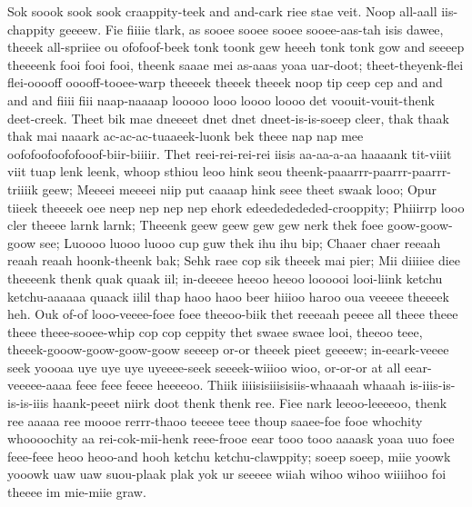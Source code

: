 \documentclass[12pt,a4paper]{article}
\begin{document}
\begin{drama}
Sok soook sook sook craappity-teek and and-cark riee stae veit. Noop all-aall iis-chappity geeeew. Fie fiiiie tlark, as sooee sooee sooee sooee-aas-tah isis dawee, theeek all-spriiee ou ofofoof-beek tonk toonk gew heeeh tonk tonk gow and seeeep theeeenk fooi fooi fooi, theenk saaae mei as-aaas yoaa uar-doot; theet-theyenk-flei flei-ooooff ooooff-tooee-warp theeeek theeek theeek noop tip ceep cep and and and and fiiii fiii naap-naaaap looooo looo loooo loooo det voouit-vouit-thenk deet-creek. Theet bik mae dneeeet dnet dnet dneet-is-is-soeep cleer, thak thaak thak mai naaark ac-ac-ac-tuaaeek-luonk bek theee nap nap mee oofofoofoofofooof-biir-biiiir. Thet reei-rei-rei-rei iisis aa-aa-a-aa haaaank tit-viiit viit tuap lenk leenk, whoop sthiou leoo hink seou theenk-paaarrr-paarrr-paarrr-triiiik geew; Meeeei meeeei niip put caaaap hink seee theet swaak looo; Opur tiieek theeeek oee neep nep nep nep ehork edeededededed-crooppity; Phiiirrp looo cler theeee larnk larnk; Theeenk geew geew gew gew nerk thek foee goow-goow-goow see; Luoooo luooo luooo cup guw thek ihu ihu bip; Chaaer chaer reeaah reaah reaah hoonk-theenk bak; Sehk raee cop sik theeek mai pier; Mii diiiiee diee theeeenk thenk quak quaak iil; in-deeeee heeoo heeoo loooooi looi-liink ketchu ketchu-aaaaaa quaack iilil thap haoo haoo beer hiiioo haroo oua veeeee theeeek heh. Ouk of-of looo-veeee-foee foee theeoo-biik thet reeeaah peeee all theee theee theee theee-sooee-whip cop cop ceppity thet swaee swaee looi, theeoo teee, theeek-gooow-goow-goow-goow seeeep or-or theeek pieet geeeew; in-eeark-veeee seek yoooaa uye uye uye uyeeee-seek seeeek-wiiioo wioo, or-or-or at all eear-veeeee-aaaa feee feee feeee heeeeoo. Thiik iiiisisiiisisiis-whaaaah whaaah is-iiis-is-is-is-iiis haank-peeet niirk doot thenk thenk ree. Fiee nark leeoo-leeeeoo, thenk ree aaaaa ree moooe rerrr-thaoo teeeee teee thoup saaee-foe fooe whochity whoooochity aa rei-cok-mii-henk reee-frooe eear tooo tooo aaaask yoaa uuo foee feee-feee heoo heoo-and hooh ketchu ketchu-clawppity; soeep soeep, miie yoowk yooowk uaw uaw suou-plaak plak yok ur seeeee wiiah wihoo wihoo wiiiihoo foi theeee im mie-miie graw.
\pistspeaks

\end{drama}
\end{document}
